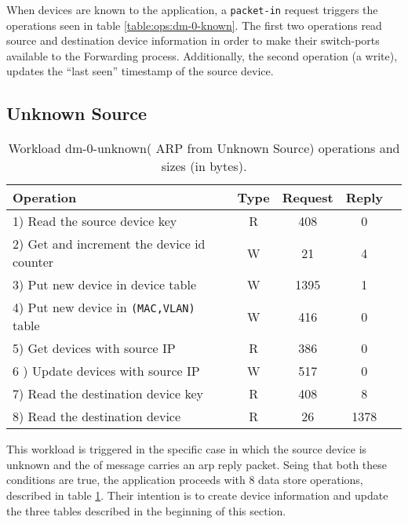 When devices are known to the application, a \texttt{packet-in} request
triggers the operations seen in table \ref{table:ops:dm-0-known}. The
first two operations read source and destination device
information in order to make their switch-ports available to the
Forwarding process. Additionally, the second operation (a write), 
updates the ``last seen'' timestamp of the source device.

\subsection{Unknown Source}
\small
\begin{table}[ht]
\centering 
\begin{tabular}{l c c c c}
Operation & Type & Request & Reply \\ \toprule 
1) Read the source device key & R & 408 & 0\\
2) Get and increment the device id counter & W & 21 & 4\\
3) Put new device in device table & W & 1395 & 1\\
4) Put new device in \texttt{(MAC,VLAN)} table & W & 416 & 0\\
5) Get devices with source IP & R & 386 & 0\\
6 ) Update devices with source IP & W & 517 & 0\\
7) Read the destination device key & R & 408 & 8\\
8) Read the destination device & R & 26 & 1378 \\\bottomrule
\end{tabular}
\caption[Workload dm-0-unknown( ARP from Unknown Source)
operations]{Workload dm-0-unknown( ARP from Unknown Source) operations
  and sizes (in bytes).}
\label{table:ops:dm-0-unknown}
\end{table}


This workload is triggered in the specific case in which  the source device
is unknown and the \gls{of} message carries an \gls{arp} reply 
packet. Seing that both these  conditions are true, the application
proceeds  with 8 data store operations, described in table
\ref{table:ops:dm-0-unknown}. Their intention is to create device
information and update the three tables described  in the beginning
of this section.  

